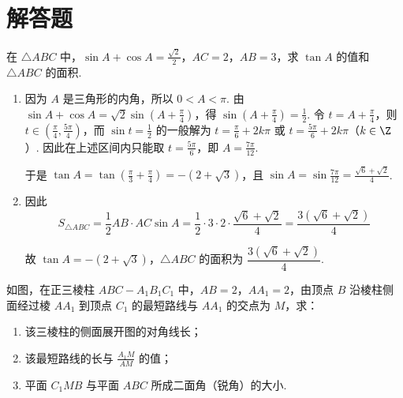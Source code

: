 \section{解答题}
\begin{problem}
在 \(\triangle ABC\) 中，\(\sin A+\cos A=\frac{\sqrt{2}}{2}\)，\(AC=2\)，\(AB=3\)，求 \(\tan A\) 的值和 \(\triangle ABC\) 的面积.
\end{problem}

\begin{solution}
\begin{enumerate}
\item
因为 \(A\) 是三角形的内角，所以 \(0<A<\pi\). 由
\(\sin A+\cos A=\sqrt{2}\sin\left(A+\frac{\pi}{4}\right)\)，得
\(\sin\left(A+\frac{\pi}{4}\right)=\frac{1}{2}\). 令
\(t=A+\frac{\pi}{4}\)，则 \(t\in\left(\frac{\pi}{4},\frac{5\pi}{4}\right)\)，而
\(\sin t=\frac{1}{2}\) 的一般解为
\(t=\frac{\pi}{6}+2k\pi\) 或 \(t=\frac{5\pi}{6}+2k\pi\)（\(k\in\Z\)）. 因此在上述区间内只能取
\(t=\frac{5\pi}{6}\)，即 \(A=\frac{7\pi}{12}\).

于是 \(\tan A=\tan\left(\frac{\pi}{3}+\frac{\pi}{4}\right)=-(2+\sqrt{3})\)，且
\(\sin A=\sin\frac{7\pi}{12}=\frac{\sqrt{6}+\sqrt{2}}{4}\).

\item
因此
\[
S_{\triangle ABC}=\frac{1}{2}AB\cdot AC\sin A
=\frac{1}{2}\cdot3\cdot2\cdot\frac{\sqrt{6}+\sqrt{2}}{4}
=\frac{3(\sqrt{6}+\sqrt{2})}{4}
\]

故 \(\tan A=-(2+\sqrt{3})\)，\(\triangle ABC\) 的面积为
\(\dfrac{3(\sqrt{6}+\sqrt{2})}{4}\).
\end{enumerate}
\end{solution}

\begin{problem}
如图，在正三棱柱 \(ABC-A_{1}B_{1}C_{1}\) 中，\(AB=2\)，\(AA_{1}=2\)，由顶点 \(B\) 沿棱柱侧面经过棱 \(AA_{1}\) 到顶点 \(C_{1}\) 的最短路线与 \(AA_{1}\) 的交点为 \(M\)，求：

\begin{enumerate}
\item 该三棱柱的侧面展开图的对角线长；
\item 该最短路线的长与 \(\frac{A_{1}M}{AM}\) 的值；
\item 平面 \(C_{1}MB\) 与平面 \(ABC\) 所成二面角（锐角）的大小.
\end{enumerate}

\end{problem}

